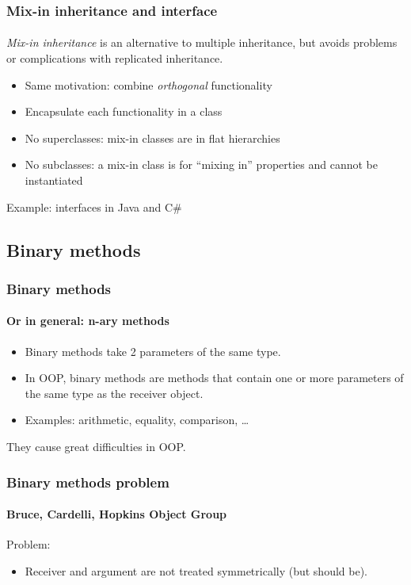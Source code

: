 \documentclass{beamer}
\begin{document}
\begin{frame}[fragile]
\frametitle{Mix-in inheritance and interface}
\framesubtitle{}
\textit{Mix-in inheritance} is an alternative to multiple inheritance, but
avoids problems or complications with replicated inheritance.

\begin{itemize}
\item Same motivation: combine \textit{orthogonal} functionality
\item Encapsulate each functionality in a class
\item No superclasses: mix-in classes are in
flat hierarchies 
\item No subclasses:  a mix-in class is for
``mixing in'' properties and cannot be instantiated
\end{itemize}

Example: interfaces in Java and C\#
\end{frame}



\subsection{Binary methods}

\begin{frame}[fragile]
\frametitle{Binary methods}
\framesubtitle{Or in general: n-ary methods}
\begin{itemize}
\item Binary methods take 2 parameters of the same type.
\item 
In OOP, binary methods are methods that contain one or more parameters
of the same type as the receiver object.
\item Examples: arithmetic, equality, comparison, \ldots
\end{itemize}
\bigskip

They cause great difficulties in OOP. 
\end{frame}

\begin{frame}[fragile]
\frametitle{Binary methods problem}
\framesubtitle{Bruce, Cardelli, Hopkins Object Group }

Problem: 

\begin{itemize}
\item Receiver and argument are not treated symmetrically (but
should be). 
\end{itemize}





\end{frame}
\end{document}
